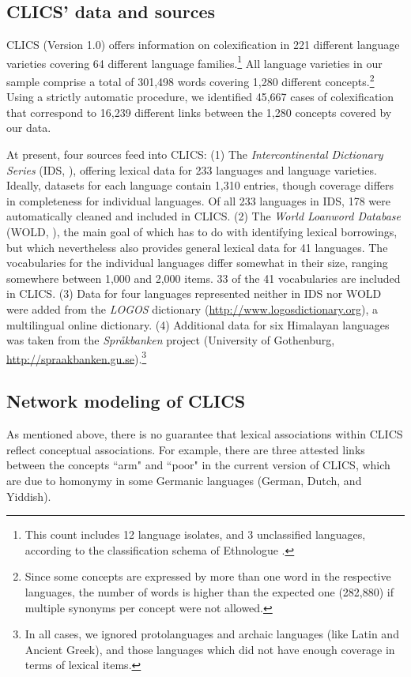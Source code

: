 \subsection{CLICS' data and sources}
CLICS (Version 1.0) offers information on colexification in 221 different language varieties
covering 64 different language families.\footnote{This count includes 12 language isolates, and 3
unclassified languages, according to the classification schema of Ethnologue \cite{Lewis2013}.} All language
varieties in our sample comprise a total of 301,498 words covering 1,280 different
concepts.\footnote{Since some concepts are expressed by more than one word in the respective
languages, the number of words is higher than the expected one (282,880) if multiple synonyms per
concept were not allowed.} Using a strictly automatic procedure, we identified 45,667 cases of
colexification that correspond to 16,239 different links between the 1,280 concepts covered by our
data. 

At present, four sources feed into CLICS: (1) The \emph{Intercontinental Dictionary Series} (IDS,
), offering lexical data for 233 languages and language varieties.
Ideally, datasets for each language contain 1,310 entries, though coverage differs in completeness
for individual languages. Of all 233 languages in IDS, 178 were automatically cleaned and included
in CLICS. (2) The \emph{World Loanword Database} (WOLD, ), the main goal
of which has to do with identifying lexical borrowings, but which nevertheless also provides general
lexical data for 41 languages. The vocabularies for the individual languages differ somewhat in
their size, ranging somewhere between 1,000 and 2,000 items. 33 of the 41 vocabularies are included
in CLICS.  (3) Data for four languages represented neither in IDS nor WOLD were added from the
\emph{LOGOS} dictionary (\url{http://www.logosdictionary.org}), a multilingual online dictionary.
(4) Additional data for six Himalayan languages was taken from the \emph{Spr\aa kbanken} project
(University of Gothenburg, \url{http://spraakbanken.gu.se}).\footnote{In all cases, we ignored
protolanguages and archaic languages (like Latin and Ancient Greek), and those languages which did not
have enough coverage in terms of lexical items.}

\subsection{Network modeling of CLICS}
As mentioned above, there is no guarantee that lexical associations within CLICS reflect conceptual
associations. For example, there are three attested links between the concepts ``arm" and ``poor" in
the current version of CLICS, which are due to homonymy in some Germanic languages (German, Dutch,
and Yiddish).
 
